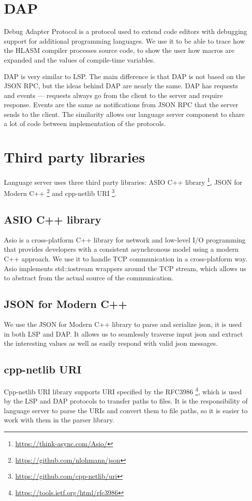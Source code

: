 \section{DAP}
Debug Adapter Protocol is a protocol used to extend code editors with debugging support for additional programming languages. We use it to be able to trace how the HLASM compiler processes source code, to show the user how macros are expanded and the values of compile-time variables.

DAP is very similar to LSP. The main difference is that DAP is not based on the JSON RPC, but the ideas behind DAP are nearly the same. DAP has requests and events ---  requests always go from the client to the server and require response. Events are the same as notifications from JSON RPC that the server sends to the client. The similarity allows our language server component to share a lot of code between implementation of the protocols.

\section{Third party libraries}
Language server uses three third party libraries: ASIO C++ library \footnote{\url{https://think-async.com/Asio/}}, JSON for Modern C++ \footnote{\url{https://github.com/nlohmann/json}} and 
cpp-netlib URI \footnote{\url{https://github.com/cpp-netlib/uri}}.

\subsection{ASIO C++ library}
Asio is a cross-platform C++ library for network and low-level I/O programming that provides developers with a consistent asynchronous model using a modern C++ approach. We use it to handle TCP communication in a cross-platform way. Asio implements std::iostream wrappers around the TCP stream, which allows us to abstract from the actual source of the communication.

\subsection{JSON for Modern C++}
We use the JSON for Modern C++ library to parse and serialize json, it is used in both LSP and DAP. It allows us to seamlessly traverse input json and extract the interesting values as well as easily respond with valid json messages.

\subsection{cpp-netlib URI}
Cpp-netlib URI library supports URI specified by the RFC3986 \footnote{\url{https://tools.ietf.org/html/rfc3986}}, which is used by the LSP and DAP protocols to transfer paths to files. It is the responsibility of language server to parse the URIs and convert them to file paths, so it is easier to work with them in the parser library. 

